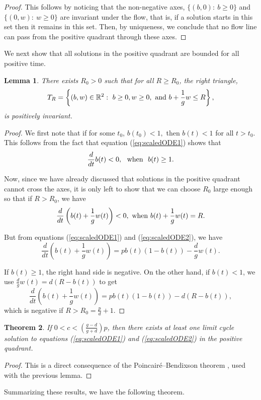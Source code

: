 \documentclass[review,authoryear]{elsarticle}
\newtheorem{theorem}{Theorem}[section]
\newtheorem{lemma}[theorem]{Lemma}
\begin{document}
\begin{proof}
  This follows by noticing that the non-negative axes, $\{(b,0):\  b \ge 0\}$ and $\{(0,w):\  w\ge 0\}$ are invariant under the flow, that is, if a solution starts in this set then it remains in this set. Then, by uniqueness, we conclude that no flow line can pass from the positive quadrant through these axes.
\end{proof}

We next show that all solutions in the positive quadrant are bounded for all positive time.  

\begin{lemma}
There exists $R_{0}>0$  such that for all $R\geq R_{0}$, the right
triangle, 
$$T_{R}=\left\{ \left(b,w\right) \in \mathbb R^{2}:\  b\ge 0, w\ge 0, \ {\rm and}\  b+\frac{1}{g}w\le R\right\}, $$  
is positively invariant.
\end{lemma}

\begin{proof}
  We first note that if for some $t_0$, $b(t_0)< 1,$ then $b(t) < 1$ for all $t>t_0$.  This follows from the fact that equation (\ref{eq:scaledODE1}) shows that 
  $$\frac{d}{dt}b(t) < 0,\  \  {\rm when}\ \ b(t)\ge 1.$$
  
  Now, since we have already discussed that solutions in the positive quadrant cannot cross the axes, it is only left to show that we can choose $R_0$ large enough so that if $R>R_0$, we have
  $$\frac{d}{dt}\left(b(t)+\frac{1}{g}w(t)\right) <0,\  {\rm when}\  b(t)+\frac{1}{g}w(t) =R.$$
  
  But from equations (\ref{eq:scaledODE1}) and (\ref{eq:scaledODE2}), we have
  $$\frac{d}{dt}\left(b(t)+\frac{1}{g}w(t)\right)  = p b(t)\left( 1-b(t)\right) -\frac{d}{g}
w\left( t\right) . $$

If $b(t) \ge 1$, the right hand side is negative.  On the other hand, if $b(t) < 1$, we use $\frac{d}{g}w(t) = d(R-b(t))$ to get
$$\frac{d}{dt}(b(t)+\frac{1}{g}w(t)) =p b(t)\left(
1-b(t)\right) -d\left( R-b(t)\right),$$
which is negative if $R>R_0= \frac{p}{d} +1.$
\end{proof}



\begin{theorem}
  If $0 < c < \left( \frac{g-d}{g+d}\right)p$, then there exists at least one  limit cycle solution to equations (\ref{eq:scaledODE1}) and (\ref{eq:scaledODE2}) in the positive quadrant.
\end{theorem}
\begin{proof}
This is a direct consequence of the Poincair\'{e}--Bendixson theorem \citep{nonlinearChaos}, used with the previous lemma.
\end{proof}
Summarizing these results, we have the following theorem. 
\end{document}
